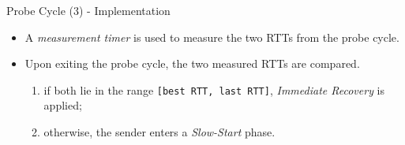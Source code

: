 \begin{frame}{Probe Cycle (3) - Implementation}
   \begin{itemize}
	\item A \textit{measurement timer} is used to measure
	     the two RTTs from the probe cycle.
	\item Upon exiting the probe cycle, the two measured RTTs
	      are compared.
	      \begin{enumerate}
		   \item if both lie in the range
    		   	 \texttt{[best RTT, last RTT]},
			 \textit{Immediate Recovery} is applied;
		   \item otherwise, the sender
    			 enters a \textit{Slow-Start} phase.
	      \end{enumerate}
   \end{itemize}
\end{frame}

